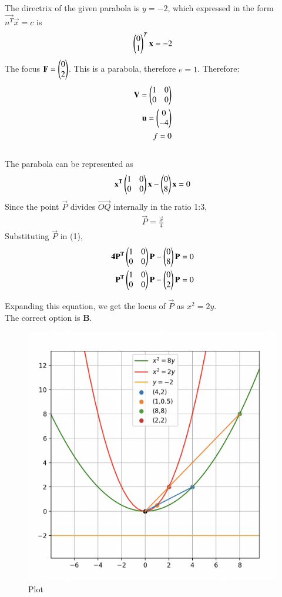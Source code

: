 \documentclass[12pt]{article}
\begin{document}
The directrix of the given parabola is $y=-2$, which expressed in the form $\vec{n^T}\vec{x} = c$ is $$\begin{pmatrix}0\\1\end{pmatrix}^T\mathbf{x} = -2$$
The focus $\mathbf{F} = \begin{pmatrix}0\\2\end{pmatrix}$. This is a parabola, therefore $e=1$.
\newpage
Therefore:
\begin{align*}
    \mathbf{V} = \begin{pmatrix} 1 & 0\\ 0 & 0\end{pmatrix}\\
    \mathbf{u} = \begin{pmatrix}0\\-4\end{pmatrix}\\
    f = 0
\end{align*}\\
The parabola can be represented as \begin{align} \mathbf{x^T}\begin{pmatrix}1 & 0\\ 0 & 0\end{pmatrix}\mathbf{x} - \begin{pmatrix}0\\8\end{pmatrix}\mathbf{x} = 0\end{align}Since the point $\vec{P}$ divides $\vec{OQ}$ internally in the ratio 1:3, \begin{align}\vec{P} = \frac{\vec{x}}{4}\end{align}
Substituting $\vec{P}$ in (1), 
\begin{align}
\mathbf{4P^T}\begin{pmatrix}1 & 0\\ 0 & 0\end{pmatrix}\mathbf{P} - \begin{pmatrix}0\\8\end{pmatrix}\mathbf{P} = 0\\
\mathbf{P^T}\begin{pmatrix}1 & 0\\ 0 & 0\end{pmatrix}\mathbf{P} - \begin{pmatrix}0\\2\end{pmatrix}\mathbf{P} = 0
\end{align}

Expanding this equation, we get the locus of $\vec{P}$ as $x^2 = 2y$. \\

The correct option is \textbf{B}.

\begin{figure}[H]
    \centering
    \includegraphics[width=0.9\columnwidth]{Figs/847.png}
    \caption{Plot}
    \label{fig:placeholder}
\end{figure}
\end{document}
